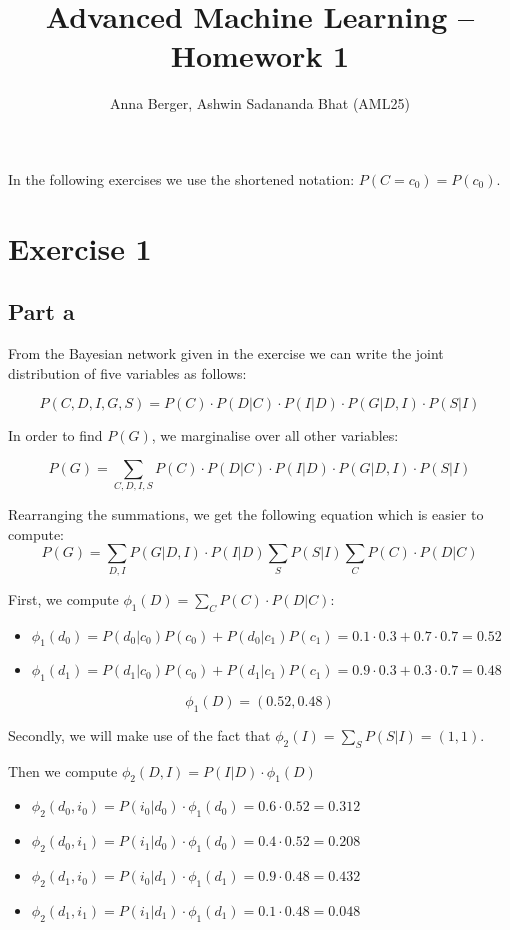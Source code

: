 \documentclass[11pt,a4paper]{article}
\title{\textbf{Advanced Machine Learning -- Homework 1}}
\author{Anna Berger, Ashwin Sadananda Bhat (AML25)}
\begin{document}
	\maketitle
	
	In the following exercises we use the shortened notation: $ P(C = c_0) = P(c_0).$
	\section*{Exercise 1}
	
	
	\subsection*{Part a}
	
	From the Bayesian network given in the exercise we can write the joint distribution of five variables as follows:
	
	$$ P(C,D,I,G,S) = P(C) \cdot  P(D|C)\cdot  P(I|D) \cdot  P(G|D,I) \cdot  P(S|I) $$ 
	
	In order to find $P(G)$, we marginalise over all other variables:
	
	$$ P(G) = \sum_{C, D, I, S} P(C) \cdot  P(D|C)\cdot P(I|D)\cdot P(G|D,I)\cdot P(S|I) $$ 
	
	Rearranging the summations, we get the following equation which is easier to compute:
	$$ P(G) = \sum_{D, I} P(G|D,I)\cdot P(I|D) \sum_{S} P(S | I)  \sum_{C} P(C) \cdot  P(D|C) $$ 
	
	First, we compute $ \phi_1(D) =  \sum_{C} P(C) \cdot  P(D|C): $
	
	\begin{itemize}
		\item $ \phi_1(d_0) = P(d_0 | c_0) P(c_0) + P(d_0 | c_1) P(c_1) = 0.1 \cdot 0.3 + 0.7 \cdot 0.7 = 0.52 $
		\item $ \phi_1(d_1) = P(d_1 | c_0) P(c_0) + P(d_1 | c_1) P(c_1) = 0.9 \cdot 0.3 + 0.3 \cdot 0.7 = 0.48 $
	\end{itemize} 
	
	$$ \phi_1(D)  = (0.52, 0.48)$$
	
	Secondly, we will make use of the fact that  $\phi_2(I) = \sum_{S} P(S | I) = (1, 1). $
	
	Then we compute $\phi_2(D, I) = P(I|D) \cdot \phi_1(D)$
	
	\begin{itemize}
		\item $\phi_2(d_0, i_0) = P(i_0 | d_0) \cdot \phi_1(d_0) = 0.6 \cdot 0.52 = 0.312 $
		\item $\phi_2(d_0, i_1) = P(i_1 | d_0) \cdot \phi_1(d_0) = 0.4 \cdot 0.52 = 0.208 $
		\item $\phi_2(d_1, i_0) = P(i_0 | d_1) \cdot \phi_1(d_1) = 0.9 \cdot 0.48 = 0.432 $
		\item $\phi_2(d_1, i_1) = P(i_1 | d_1) \cdot \phi_1(d_1) = 0.1 \cdot 0.48 = 0.048 $
	\end{itemize}
	
\end{document}
